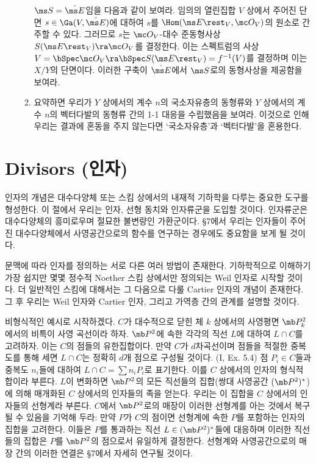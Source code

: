 \begin{enumerate}[label=\tb{5.\arabic*.},itemindent=0mm,itemsep=2mm]
\begin{enumerate}[label=(\alph*)]
	$\ms S=\check{\ms E}$임을 다음과 같이 보여라.
	임의의 열린집합 $V$ 상에서 주어진 단면 $s\in\Ga(V,\check{\ms E})$에 대하여
	$s$를 $\Hom(\ms E\rest_V,\mc O_V)$의 원소로 간주할 수 있다.
	그러므로 $s$는 $\mc O_V$-대수 준동형사상 $S(\ms E\rest_V)\ra\mc O_V$를 결정한다.
	이는 스펙트럼의 사상 $V=\bSpec\mc O_V\ra\bSpec S(\ms E\rest_V)=f^{-1}(V)$를 결정하며 이는 $X/Y$의 단면이다.
	이러한 구축이 $\check{\ms E}$에서 $\ms S$로의 동형사상을 제공함을 보여라.
	\item 요약하면 우리가 $Y$ 상에서의 계수 $n$의 국소자유층의 동형류와
	$Y$ 상에서의 계수 $n$의 벡터다발의 동형류 간의 1-1 대응을 수립했음을 보여라.
	이것으로 인해 우리는 결과에 혼동을 주지 않는다면 `국소자유층'과 `벡터다발'을 혼용한다.
	\end{enumerate}
	\end{enumerate}
	
	
	
	\section{Divisors (인자)}
	
	인자의 개념은 대수다양체 또는 스킴 상에서의 내재적 기하학을 다루는 중요한 도구를 형성한다.
	이 절에서 우리는 인자, 선형 동치와 인자류군을 도입할 것이다. 인자류군은 대수다양체의 흥미로우며 절묘한 불변량인 가환군이다.
	\S 7에서 우리는 인자들이 주어진 대수다양체에서 사영공간으로의 함수를 연구하는 경우에도 중요함을 보게 될 것이다.
	
	문맥에 따라 인자를 정의하는 서로 다른 여러 방법이 존재한다.
	기하학적으로 이해하기 가장 쉽지만 몇몇 정수적 Noether 스킴 상에서만 정의되는 Weil 인자로 시작할 것이다.
	더 일반적인 스킴에 대해서는 그 다음으로 다룰 Cartier 인자의 개념이 존재한다.
	그 후 우리는 Weil 인자와 Cartier 인자, 그리고 가역층 간의 관계를 설명할 것이다.
	
	비형식적인 예시로 시작하겠다. $C$가 대수적으로 닫힌 체 $k$ 상에서의 사영평면 $\mb P_k^2$에서의 비특이 사영 곡선이라 하자.
	$\mb P^2$에 속한 각각의 직선 $L$에 대하여 $L\cap C$를 고려하자. 이는 $C$의 점들의 유한집합이다.
	만약 $C$가 $d$차곡선이며 점들을 적절한 중복도를 통해 세면 $L\cap C$는 정확히 $d$개 점으로 구성될 것이다. (I, Ex. 5.4)
	점 $P_i\in C$들과 중복도 $n_i$들에 대하여 $L\cap C=\sum n_iP_i$로 표기한다. 이를 $C$ 상에서의 인자의 형식적 합이라 부른다.
	$L$이 변화하면 $\mb P^2$의 모든 직선들의 집합(쌍대 사영공간 $(\mb P^2)^*$)에 의해 매개화된 $C$ 상에서의 인자들의 족을 얻는다.
	우리는 이 집합을 $C$ 상에서의 인자들의 선형계라 부른다.
	$C$에서 $\mb P^2$로의 매장이 이러한 선형계를 아는 것에서 복구될 수 있음을 기억해 두라:
	만약 $P$가 $C$의 점이면 선형계에 속한 $P$를 포함하는 인자의 집합을 고려한다.
	이들은 $P$를 통과하는 직선 $L\in(\mb P^2)^*$들에 대응하며 이러한 직선들의 집합은 $P$를 $\mb P^2$의 점으로서 유일하게 결정한다.
	선형계와 사영공간으로의 매장 간의 이러한 연결은 \S 7에서 자세히 연구될 것이다.
	
